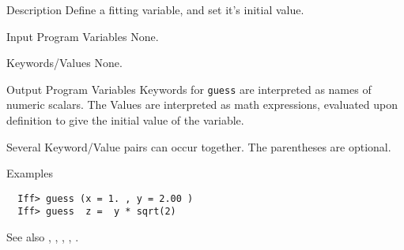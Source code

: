 
\begin{IFFcom}
\item[Description] Define a fitting variable, and set it's initial value.
\item[Input Program Variables] None.
\item[Keywords/Values] None.
\item[Output Program Variables] Keywords for {\texttt{guess}} are interpreted as names of
  numeric scalars.  The Values are interpreted as math expressions,
  evaluated upon definition to give the initial value of the variable.
  
  Several Keyword/Value pairs can occur together.  The parentheses are
  optional.
\item[Examples] {\hspace{1.in} \vspace{-0.1truein} \relax }
\begin{verbatim} 
  Iff> guess (x = 1. , y = 2.00 )
  Iff> guess  z =  y * sqrt(2) 
\end{verbatim}
\item[See also] {}, {}, {}, 
  {}, {}.
\end{IFFcom}


